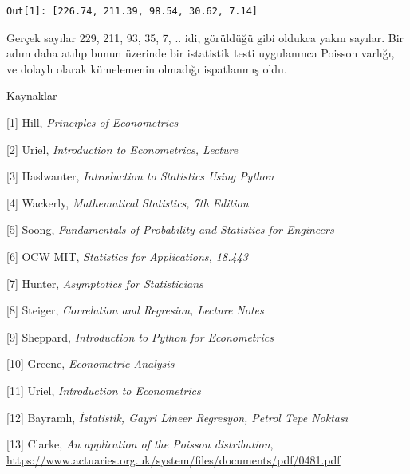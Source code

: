 \documentclass[12pt,fleqn]{article}\usepackage{../../common}
\begin{document}
\begin{verbatim}
Out[1]: [226.74, 211.39, 98.54, 30.62, 7.14]
\end{verbatim}

Gerçek sayılar 229, 211, 93, 35, 7, .. idi, görüldüğü gibi oldukca yakın
sayılar. Bir adım daha atılıp bunun üzerinde bir istatistik testi
uygulanınca Poisson varlığı, ve dolaylı olarak kümelemenin olmadığı ispatlanmış
oldu.

Kaynaklar

[1] Hill, {\em Principles of Econometrics}

[2] Uriel, {\em Introduction to Econometrics, Lecture}

[3] Haslwanter, {\em Introduction to Statistics Using Python}

[4] Wackerly, {\em Mathematical Statistics, 7th Edition}

[5] Soong, {\em Fundamentals of Probability and Statistics for Engineers}

[6] OCW MIT, {\em Statistics for Applications, 18.443}

[7] Hunter, {\em Asymptotics for Statisticians}

[8] Steiger, {\em Correlation and Regresion, Lecture Notes}

[9] Sheppard, {\em Introduction to Python for Econometrics}

[10] Greene, {\em Econometric Analysis}

[11] Uriel, {\em Introduction to Econometrics}

[12] Bayramlı, {\em İstatistik, Gayri Lineer Regresyon, Petrol Tepe Noktası}

[13] Clarke, {\em An application of the Poisson distribution},
     \url{https://www.actuaries.org.uk/system/files/documents/pdf/0481.pdf}
\end{document}
